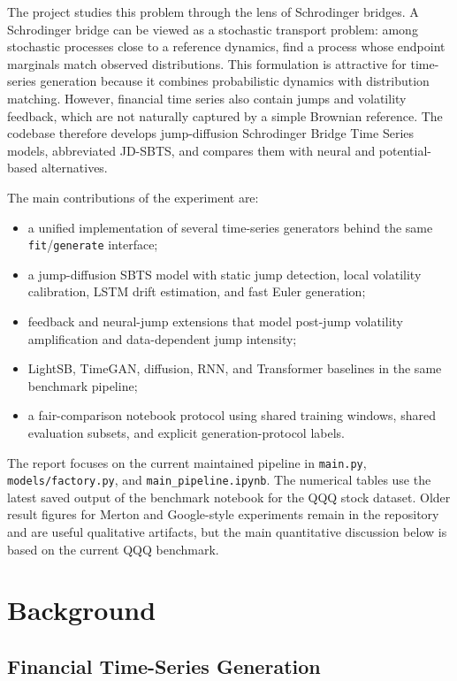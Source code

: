 \documentclass[11pt,a4paper]{article}
\begin{document}
The project studies this problem through the lens of Schrodinger bridges. A
Schrodinger bridge can be viewed as a stochastic transport problem: among
stochastic processes close to a reference dynamics, find a process whose
endpoint marginals match observed distributions. This formulation is attractive
for time-series generation because it combines probabilistic dynamics with
distribution matching. However, financial time series also contain jumps and
volatility feedback, which are not naturally captured by a simple Brownian
reference. The codebase therefore develops jump-diffusion Schrodinger Bridge
Time Series models, abbreviated JD-SBTS, and compares them with neural and
potential-based alternatives.

The main contributions of the experiment are:
\begin{itemize}
    \item a unified implementation of several time-series generators behind the
    same \texttt{fit}/\texttt{generate} interface;
    \item a jump-diffusion SBTS model with static jump detection, local
    volatility calibration, LSTM drift estimation, and fast Euler generation;
    \item feedback and neural-jump extensions that model post-jump volatility
    amplification and data-dependent jump intensity;
    \item LightSB, TimeGAN, diffusion, RNN, and Transformer baselines in the
    same benchmark pipeline;
    \item a fair-comparison notebook protocol using shared training windows,
    shared evaluation subsets, and explicit generation-protocol labels.
\end{itemize}

The report focuses on the current maintained pipeline in \texttt{main.py},
\texttt{models/factory.py}, and \texttt{main\_pipeline.ipynb}. The numerical
tables use the latest saved output of the benchmark notebook for the QQQ stock
dataset. Older result figures for Merton and Google-style experiments remain in
the repository and are useful qualitative artifacts, but the main quantitative
discussion below is based on the current QQQ benchmark.

\section{Background}

\subsection{Financial Time-Series Generation}
\end{document}
